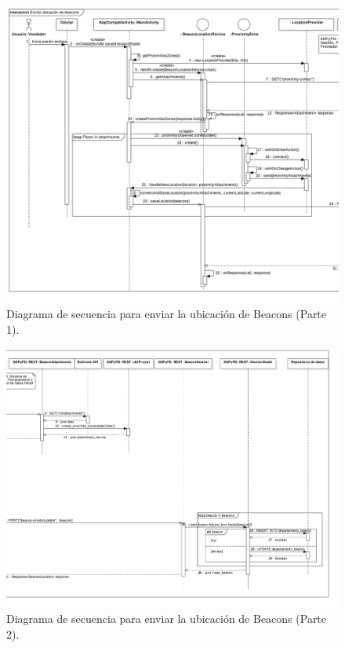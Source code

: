 \FloatBarrier
\begin{figure}[htbp!]
		\centering
			\includegraphics[width=1 \textwidth]{imagenes/adrian/vendedor/prototipo1/enviar_Beacons_1}
		\caption{Diagrama de secuencia para enviar la ubicación de Beacons (Parte 1).}
		\label{secuencia-AIPV1-BeaconsUno}
\end{figure}
\FloatBarrier

\FloatBarrier
\begin{figure}[htbp!]
		\centering
			\includegraphics[width=1 \textwidth]{imagenes/adrian/vendedor/prototipo1/enviar_Beacons_2}
		\caption{Diagrama de secuencia para enviar la ubicación de Beacons (Parte 2).}
		\label{secuencia-AIPV1-BeaconsDos}
\end{figure}
\FloatBarrier
